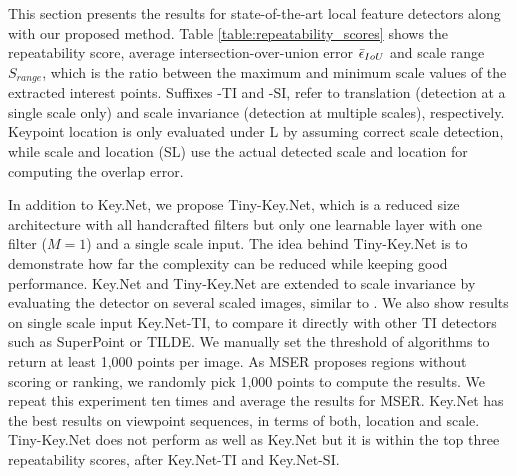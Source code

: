 This section presents the results for state-of-the-art local feature detectors along with our proposed method. Table \ref{table:repeatability_scores} shows the repeatability score,  average intersection-over-union error $\Bar{\epsilon}_{IoU}$ and scale range $S_{range}$, which is the ratio between the maximum and minimum scale values of the extracted interest points.  Suffixes -TI and -SI, refer to translation (detection at a single scale only) and scale invariance (detection at multiple scales), respectively. Keypoint location is only evaluated under L by assuming correct scale detection, while scale and location (SL) use the actual detected scale and location for computing the overlap error.

In addition to Key.Net, we propose Tiny-Key.Net, which is a reduced size architecture with all handcrafted filters but only one learnable layer with one filter  ($M = 1$) and a single scale input. The idea behind Tiny-Key.Net is to demonstrate how far the complexity can be reduced while keeping good performance. Key.Net and Tiny-Key.Net are extended to scale invariance by evaluating the detector on several scaled images, similar to \cite{Zhang_Felix_CVPR_17}. We also show results on single scale input Key.Net-TI, to compare it directly with other TI detectors such as SuperPoint or TILDE. We manually set the threshold of algorithms to return at least 1,000 points per image. As MSER proposes regions without scoring or ranking, we randomly pick 1,000 points to compute the results. We repeat this experiment ten times and average the results for MSER. Key.Net has the best results on viewpoint sequences, in terms of both, location and scale. Tiny-Key.Net does not perform as well as Key.Net but it is within the top three repeatability scores, after Key.Net-TI and Key.Net-SI.


